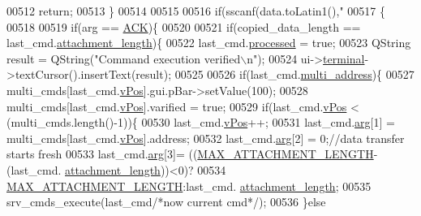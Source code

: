 \begin{DoxyCode}
{00512             \textcolor{keywordflow}{return};
00513         \}
00514 
00515 
00516         \textcolor{keywordflow}{if}(sscanf(data.toLatin1(),\textcolor{stringliteral}{"%
00517         \{
00518 
00519            \textcolor{keywordflow}{if}(arg == \hyperlink{a00034_a6f6489887e08bff4887d0bc5dcf214d8}{ACK})\{
00520 
00521                \textcolor{keywordflow}{if}(copied\_data\_length == last\_cmd.\hyperlink{a00001_ae5afad7c81dab7d9ab6587251aafdbf4}{attachment\_length})\{
00522                    last\_cmd.\hyperlink{a00001_a3e88f779da9798a5da7dda227e2ca388}{processed} = \textcolor{keyword}{true};
00523                    QString result =  QString(\textcolor{stringliteral}{"Command execution verified\(\backslash\)n"});
00524                    ui->\hyperlink{a00027_aae71c46ea4546df5994735dee573b2dd}{terminal}->textCursor().insertText(result);
00525 
00526                    \textcolor{keywordflow}{if}(last\_cmd.\hyperlink{a00001_a8e69b971c61ced27a7567efd2bf0db59}{multi\_address})\{
00527                         multi\_cmds[last\_cmd.\hyperlink{a00001_a2b48b371fd84be2a8ad581b1ad708b88}{vPos}].gui.pBar->setValue(100);
00528                         multi\_cmds[last\_cmd.\hyperlink{a00001_a2b48b371fd84be2a8ad581b1ad708b88}{vPos}].varified = \textcolor{keyword}{true};
00529                     \textcolor{keywordflow}{if}(last\_cmd.\hyperlink{a00001_a2b48b371fd84be2a8ad581b1ad708b88}{vPos} < (multi\_cmds.length()-1))\{
00530                        last\_cmd.\hyperlink{a00001_a2b48b371fd84be2a8ad581b1ad708b88}{vPos}++;
00531                        last\_cmd.\hyperlink{a00001_a56e6c2d7315d0ae60a51e8b140c9cfe4}{arg}[1] = multi\_cmds[last\_cmd.\hyperlink{a00001_a2b48b371fd84be2a8ad581b1ad708b88}{vPos}].address;
00532                        last\_cmd.\hyperlink{a00001_a56e6c2d7315d0ae60a51e8b140c9cfe4}{arg}[2] = 0;\textcolor{comment}{//data transfer starts fresh}
00533                        last\_cmd.\hyperlink{a00001_a56e6c2d7315d0ae60a51e8b140c9cfe4}{arg}[3]= ((\hyperlink{a00031_aa8abe3a822c64813f7aaba3ca7e3db9c}{MAX\_ATTACHMENT\_LENGTH}-(last\_cmd.
      \hyperlink{a00001_ae5afad7c81dab7d9ab6587251aafdbf4}{attachment\_length}))<0)?
00534                                           \hyperlink{a00031_aa8abe3a822c64813f7aaba3ca7e3db9c}{MAX\_ATTACHMENT\_LENGTH}:last\_cmd.
      \hyperlink{a00001_ae5afad7c81dab7d9ab6587251aafdbf4}{attachment\_length};
00535                        srv\_cmds\_execute(last\_cmd\textcolor{comment}{/*now current cmd*/});
00536                    \}\textcolor{keywordflow}{else}
}}
\end{DoxyCode}
